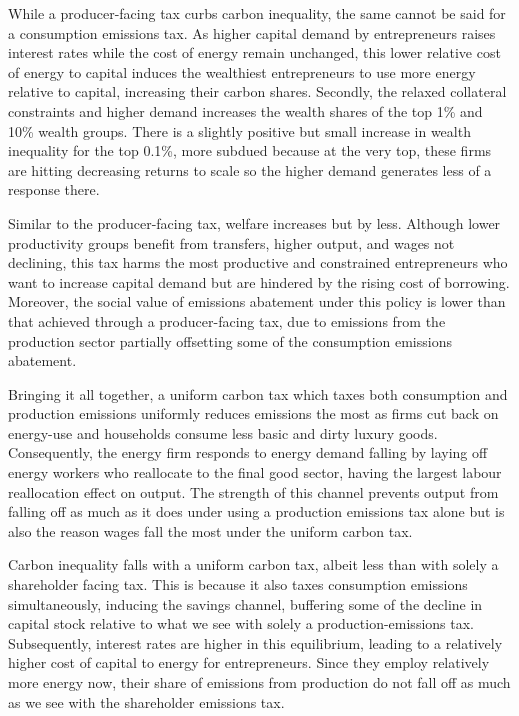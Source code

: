 \documentclass[12pt,a4paper]{article}
\begin{document}
\hspace*{6mm}  While a producer-facing tax curbs carbon inequality, the same cannot be said for a consumption emissions tax. As higher capital demand by entrepreneurs raises interest rates while the cost of energy remain unchanged, this lower relative cost of energy to capital induces the wealthiest entrepreneurs to use more energy relative to capital, increasing their carbon shares. Secondly, the relaxed collateral constraints and higher demand increases the wealth shares of the top 1\% and 10\% wealth groups. There is a slightly positive but small increase in wealth inequality for the top 0.1\%, more subdued because at the very top, these firms are hitting decreasing returns to scale so the higher demand generates less of a response there. 

\hspace*{6mm} Similar to the producer-facing tax, welfare increases but by less. Although lower productivity groups benefit from transfers, higher output, and wages not declining, this tax harms the most productive and constrained entrepreneurs who want to increase capital demand but are hindered by the rising cost of borrowing. Moreover, the social value of emissions abatement under this policy is lower than that achieved through a producer-facing tax, due to emissions from the production sector partially offsetting some of the consumption emissions abatement.


\hspace*{6mm} Bringing it all together, a uniform carbon tax which taxes both consumption and production emissions uniformly reduces emissions the most as firms cut back on energy-use and households consume less basic and dirty luxury goods. Consequently, the energy firm responds to energy demand falling by laying off energy workers who reallocate to the final good sector, having the largest labour reallocation effect on output. The strength of this channel prevents output from falling off as much as it does under using a production emissions tax alone but is also the reason wages fall the most under the uniform carbon tax. 

\hspace*{6mm} Carbon inequality falls with a uniform carbon tax, albeit less than with solely a shareholder facing tax.  This is because it also taxes consumption emissions simultaneously, inducing the savings channel, buffering some of the decline in capital stock relative to what we see with solely a production-emissions tax. Subsequently, interest rates are higher in this equilibrium, leading to a relatively higher cost of capital to energy for entrepreneurs. Since they employ relatively more energy now, their share of emissions from production do not fall off as much as we see with the shareholder emissions tax. 
\end{document}
